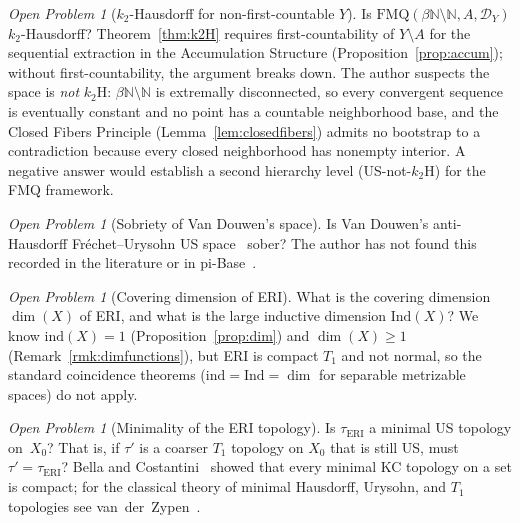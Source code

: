 \documentclass[11pt]{article}
\theoremstyle{definition}
\theoremstyle{remark}
\newtheorem{openproblem}[theorem]{Open Problem}
\begin{document}
\begin{openproblem}[$k_2$-Hausdorff for non-first-countable $Y$]\label{op:k2H}
Is $\mathrm{FMQ}(\beta\mathbb{N} \setminus \mathbb{N}, A, \mathcal{D}_Y)$
$k_2$-Hausdorff?
Theorem~\ref{thm:k2H} requires first-countability of $Y \setminus A$
for the sequential extraction in the Accumulation Structure
(Proposition~\ref{prop:accum}); without first-countability, the
argument breaks down.
The author suspects the space is \emph{not} $k_2\mathrm{H}$:
$\beta\mathbb{N} \setminus \mathbb{N}$ is extremally disconnected, so
every convergent sequence is eventually constant and no point has a
countable neighborhood base, and the Closed Fibers Principle
(Lemma~\ref{lem:closedfibers}) admits no bootstrap to a contradiction
because every closed neighborhood has nonempty interior.
A negative answer would establish a second hierarchy level
(US-not-$k_2\mathrm{H}$) for the FMQ framework.
\end{openproblem}

\begin{openproblem}[Sobriety of Van Douwen's space]\label{op:vandouwen}
Is Van Douwen's anti-Hausdorff Fr\'{e}chet--Urysohn US
space~\cite{bib:vandouwen} sober?
The author has not found this recorded in the literature or in
pi-Base~\cite{bib:pibase}.
\end{openproblem}

\begin{openproblem}[Covering dimension of ERI]\label{op:dim}
What is the covering dimension $\dim(X)$ of ERI, and what is the large
inductive dimension $\mathrm{Ind}(X)$?
We know $\mathrm{ind}(X) = 1$ (Proposition~\ref{prop:dim}) and
$\dim(X) \geq 1$ (Remark~\ref{rmk:dimfunctions}), but ERI is compact
$T_1$ and not normal, so the standard coincidence theorems
($\mathrm{ind} = \mathrm{Ind} = \dim$ for separable metrizable
spaces) do not apply.
\end{openproblem}

\begin{openproblem}[Minimality of the ERI topology]\label{op:minimal}
Is $\tau_{\mathrm{ERI}}$ a minimal US topology on~$X_0$?
That is, if $\tau'$ is a coarser $T_1$ topology on $X_0$ that is still
US, must $\tau' = \tau_{\mathrm{ERI}}$?
Bella and Costantini~\cite{bib:bella} showed that every minimal KC
topology on a set is compact; for the classical theory of minimal
Hausdorff, Urysohn, and $T_1$ topologies see
van~der~Zypen~\cite{bib:vanderzypen-minimal}.
\end{openproblem}
\end{document}
